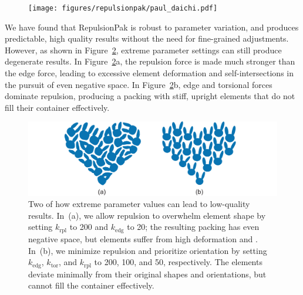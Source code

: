 \begin{figure}
\centering
\texttt{[image: figures/repulsionpak/paul\_daichi.pdf]} 
\vspace{-10pt}
\caption[Artist-made Packings using RepulsionPak]
{\label{paul_daichi_packings}
}
\end{figure}

We have found that RepulsionPak is robust to parameter variation, and 
produces predictable, high quality results without the need for fine-grained
adjustments.  However, as shown in Figure~\ref{bad_results}, extreme parameter 
settings can still produce degenerate results.
In Figure~\ref{bad_results}a, the repulsion force is made much stronger than 
the edge force, leading to excessive element deformation and
self-intersections in the pursuit of even negative space.  In 
Figure~\ref{bad_results}b, edge and torsional forces dominate repulsion,
producing a packing with stiff, upright elements that do not fill their
container effectively.


\makeatletter %
\setlength{\@fptop}{0pt} %
\makeatother %
\begin{figure}
\centering
\includegraphics[width=1.0\textwidth]{figures/repulsionpak/bad_results.pdf} 
\vspace{-12pt}
\caption[Two examples of how extreme parameter values can lead to \newline 
	low-quality results]
	{\label{bad_results}
Two  of how extreme parameter values can lead to
	low-quality results.  In~(a), we allow repulsion to overwhelm element
	shape by setting $k_\mathrm{rpl}$ to 200 and $k_\mathrm{edg}$ to 20; the resulting packing 
	has even negative space, but elements suffer from high deformation
	and .  In~(b), we minimize repulsion and prioritize
	orientation by setting $k_\mathrm{edg}$, $k_\mathrm{tor}$, and $k_\mathrm{rpl}$ to 200, 100, and 50,
	respectively.  The elements deviate minimally from their original shapes 
	and orientations, but cannot fill the container effectively.
}
\end{figure}



